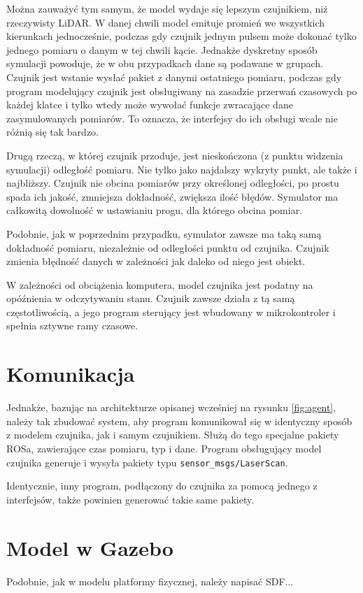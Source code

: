 Można zauważyć tym samym, że model wydaje się lepszym czujnikiem, niż rzeczywisty LiDAR.
W danej chwili model emituje promień we wszystkich kierunkach jednocześnie, podczas gdy czujnik jednym pulsem może dokonać tylko jednego pomiaru o danym w tej chwili kącie.
Jednakże dyskretny sposób symulacji powoduje, że w obu przypadkach dane są podawane w grupach.
Czujnik jest wstanie wysłać pakiet z danymi ostatniego pomiaru, podczas gdy program modelujący czujnik jest obsługiwany na zasadzie przerwań czasowych 
po każdej klatce i tylko wtedy może wywołać funkcje zwracające dane zasymulowanych pomiarów.
To oznacza, że interfejsy do ich obsługi wcale nie różnią się tak bardzo.

Drugą rzeczą, w której czujnik przoduje, jest nieskończona (z punktu widzenia symulacji) odległość pomiaru.
Nie tylko jako najdalszy wykryty punkt, ale także i najbliższy. 
Czujnik nie obcina pomiarów przy określonej odległości, po prostu spada ich jakość, zmniejsza dokładność, zwiększa ilość błędów.
Symulator ma całkowitą dowolność w ustawianiu progu, dla którego obcina pomiar.

Podobnie, jak w poprzednim przypadku, symulator zawsze ma taką samą dokładność pomiaru, niezależnie od odległości punktu od czujnika.
Czujnik zmienia błędność danych w zależności jak daleko od niego jest obiekt.

W zależności od obciążenia komputera, model czujnika jest podatny na opóźnienia w odczytywaniu stanu.
Czujnik zawsze działa z tą samą częstotliwością, a jego program sterujący jest wbudowany w mikrokontroler i spełnia sztywne ramy czasowe.

\section{Komunikacja}
Jednakże, bazując na architekturze opisanej wcześniej na rysunku \ref{fig:agent}, należy tak zbudować system, aby program komunikował się w identyczny sposób z 
modelem czujnika, jak i samym czujnikiem.
Służą do tego specjalne pakiety ROSa, zawierające czas pomiaru, typ i dane.
Program obsługujący model czujnika generuje i wysyła pakiety typu \texttt{sensor\_msgs/LaserScan}.

Identycznie, inny program, podłączony do czujnika za pomocą jednego z interfejsów, także powinien generować takie same pakiety.

\section{Model w Gazebo}
Podobnie, jak w modelu platformy fizycznej, należy napisać SDF...

